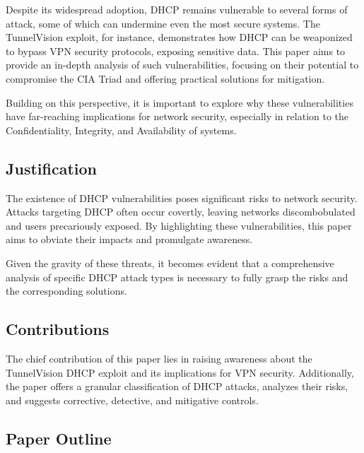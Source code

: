 \documentclass[conference]{IEEEtran}
\begin{document}
        Despite its widespread adoption, DHCP remains vulnerable to several forms of attack, some of which can undermine even the most secure systems. The TunnelVision exploit, for instance, demonstrates how DHCP can be weaponized to bypass VPN security protocols, exposing sensitive data. This paper aims to provide an in-depth analysis of such vulnerabilities, focusing on their potential to compromise the CIA Triad and offering practical solutions for mitigation.

        Building on this perspective, it is important to explore why these vulnerabilities have far-reaching implications for network security, especially in relation to the Confidentiality, Integrity, and Availability of systems.

    \subsection{Justification}
    \label{subsec:Justification}
        
        The existence of DHCP vulnerabilities poses significant risks to network security. Attacks targeting DHCP often occur covertly, leaving networks discombobulated and users precariously exposed. By highlighting these vulnerabilities, this paper aims to obviate their impacts and promulgate awareness.

        Given the gravity of these threats, it becomes evident that a comprehensive analysis of specific DHCP attack types is necessary to fully grasp the risks and the corresponding solutions.

    \subsection{Contributions}
    \label{subsec:Contributions}
    
        The chief contribution of this paper lies in raising awareness about the TunnelVision DHCP exploit and its implications for VPN security. Additionally, the paper offers a granular classification of DHCP attacks, analyzes their risks, and suggests corrective, detective, and mitigative controls.

    \subsection{Paper Outline}
    \label{subsec:Paper_Outline}
\end{document}
